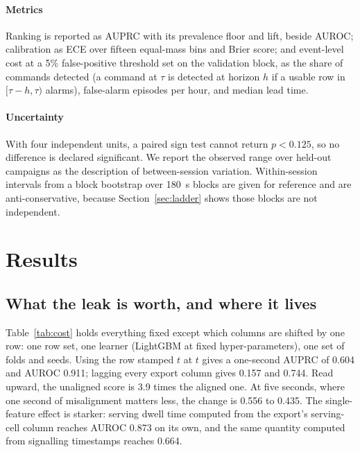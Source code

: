 \documentclass[preprint,review,12pt]{elsarticle}\usepackage{lineno}\linenumbers
\begin{document}
\paragraph{Metrics} Ranking is reported as AUPRC with its prevalence floor and lift, beside AUROC; calibration as ECE over fifteen equal-mass bins and Brier score; and event-level cost at a 5\% false-positive threshold set on the validation block, as the share of commands detected (a command at $\tau$ is detected at horizon $h$ if a usable row in $[\tau-h,\tau)$ alarms), false-alarm episodes per hour, and median lead time.

\paragraph{Uncertainty} With four independent units, a paired sign test cannot return $p < 0.125$, so no difference is declared significant. We report the observed range over held-out campaigns as the description of between-session variation. Within-session intervals from a block bootstrap over 180~s blocks are given for reference and are anti-conservative, because Section~\ref{sec:ladder} shows those blocks are not independent.

\section{Results}
\label{sec:results}

\subsection{What the leak is worth, and where it lives}
\label{sec:cost}

Table~\ref{tab:cost} holds everything fixed except which columns are shifted by one row: one row set, one learner (LightGBM at fixed hyper-parameters), one set of folds and seeds. Using the row stamped $t$ at $t$ gives a one-second AUPRC of 0.604 and AUROC 0.911; lagging every export column gives 0.157 and 0.744. Read upward, the unaligned score is 3.9 times the aligned one. At five seconds, where one second of misalignment matters less, the change is 0.556 to 0.435. The single-feature effect is starker: serving dwell time computed from the export's serving-cell column reaches AUROC 0.873 on its own, and the same quantity computed from signalling timestamps reaches 0.664.
\end{document}
